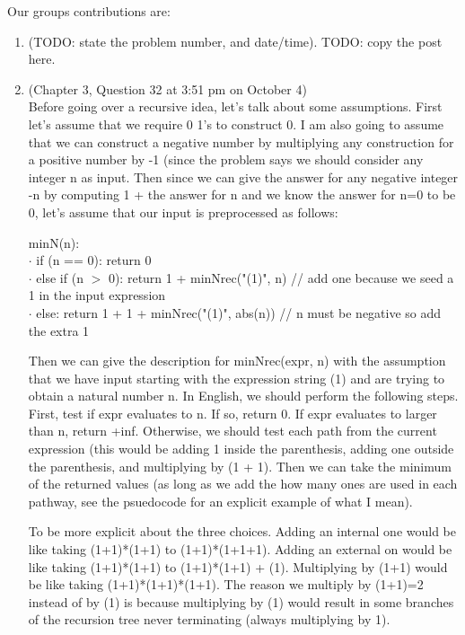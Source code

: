 \documentclass{article}
\begin{document}
Our groups contributions are:
\begin{enumerate}
    \item (TODO: state the problem number, and date/time). TODO:
        copy the post here.
    \item (Chapter 3, Question 32 at 3:51 pm on October 4) \\
        Before going over a recursive idea, let's talk about some assumptions.
        First let's assume that we require 0 1's to construct 0.
        I am also going to assume that we can construct a negative number by multiplying any construction for a positive number by -1 (since the problem says we should consider any integer n as input.
        Then since we can give the answer for any negative integer -n by computing 1 + the answer for n and we know the answer for n=0 to be 0, let's assume that our input is preprocessed as follows:

        \begin{algorithm}
            minN(n): \\
            $\cdot$ \hspace{1.5em} if (n == 0): return 0 \\
            $\cdot$ \hspace{1.5em} else if (n $>$ 0): return 1 + minNrec("(1)", n) // add one because we seed a 1 in the input expression \\
            $\cdot$ \hspace{1.5em} else: return 1 + 1 + minNrec("(1)", abs(n)) // n must be negative so add the extra 1
        \end{algorithm}

        Then we can give the description for minNrec(expr, n) with the assumption that we have input starting with the expression string (1) and are trying to obtain a natural number n.
        In English, we should perform the following steps.
        First, test if expr evaluates to n.
        If so, return 0. If expr evaluates to larger than n, return +inf. Otherwise, we should test each path from the current expression (this would be adding 1 inside the parenthesis, adding one outside the parenthesis, and multiplying by (1 + 1).
        Then we can take the minimum of the returned values (as long as we add the how many ones are used in each pathway, see the psuedocode for an explicit example of what I mean).

        To be more explicit about the three choices.
        Adding an internal one would be like taking (1+1)*(1+1) to (1+1)*(1+1+1).
        Adding an external on would be like taking (1+1)*(1+1) to (1+1)*(1+1) + (1).
        Multiplying by (1+1) would be like taking (1+1)*(1+1)*(1+1).
        The reason we multiply by (1+1)=2 instead of by (1) is because multiplying by (1) would result in some branches of the recursion tree never terminating (always multiplying by 1).


\end{enumerate}
\end{document}
